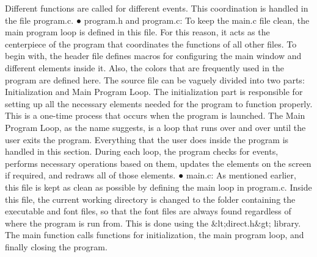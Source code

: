\documentclass[report]{subfiles}
\begin{document}
Different functions are called for different events. This
coordination is handled in the file program.c.
● program.h and program.c:
To keep the main.c file clean, the main program loop is defined in
this file. For this reason, it acts as the centerpiece of the program
that coordinates the functions of all other files. To begin with, the
header file defines macros for configuring the main window and
different elements inside it. Also, the colors that are frequently
used in the program are defined here.
The source file can be vaguely divided into two parts:
Initialization and Main Program Loop. The initialization part is
responsible for setting up all the necessary elements needed for the
program to function properly. This is a one-time process that
occurs when the program is launched.
The Main Program Loop, as the name suggests, is a loop that runs
over and over until the user exits the program. Everything that the
user does inside the program is handled in this section. During
each loop, the program checks for events, performs necessary
operations based on them, updates the elements on the screen if
required, and redraws all of those elements.
● main.c:
As mentioned earlier, this file is kept as clean as possible by
defining the main loop in program.c. Inside this file, the current
working directory is changed to the folder containing the
executable and font files, so that the font files are always found
regardless of where the program is run from. This is done using the
&lt;direct.h&gt; library.
The main function calls functions for initialization, the main
program loop, and finally closing the program.
\end{document}
